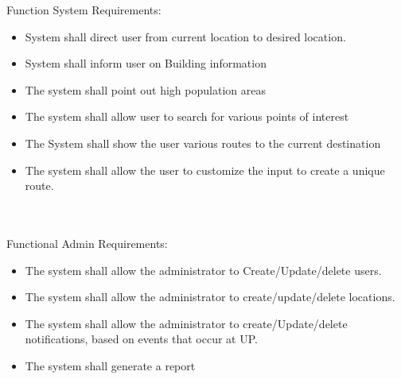 {
Function System Requirements:
\begin{itemize}
  \item System shall direct user from current location to desired location.
  \item System shall inform user on Building information
  \item The system shall point out high population areas
  \item The system shall allow user to search for various points of interest
  \item The System shall show the user various routes to the current destination
  \item The system shall allow the user to customize the input to create a unique route.
\end{itemize}
\\\\
Functional Admin Requirements:
\begin{itemize}
  \item The system shall allow the administrator to Create/Update/delete users.
  \item The system shall allow the administrator to create/update/delete locations.
  \item The system shall allow the administrator to create/Update/delete notifications, based on events that occur at UP. 
  \item The system shall generate a report
\end{itemize}
}
